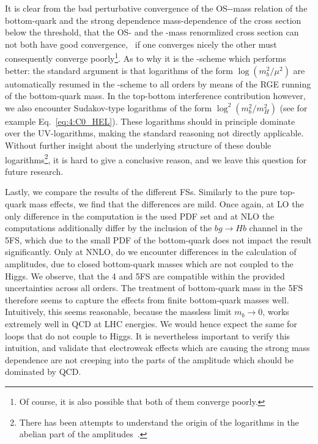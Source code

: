 It is clear from the bad perturbative convergence of the \acs{OS}-\MS-mass relation of the bottom-quark and the strong dependence mass-dependence of the cross section below the threshold, that the \acs{OS}- and the \MS-mass renormlized cross section can not both have good convergence, \ie\ if one converges nicely the other must consequently converge poorly\footnote{Of course, it is also possible that both of them converge poorly.}. As to why it is the \MS-scheme which performs better: the standard argument is that logarithms of the form $\log \left(m_b^2/\mu^2\right)$ are automatically resumed in the \MS-scheme to all orders by means of the \acs{RGE} running of the bottom-quark mass. In the top-bottom interference contribution however, we also encounter Sudakov-type logarithms of the form $\log^2 \left(m_b^2/m_H^2 \right)$ (see for example Eq.~\eqref{eq:4:C0_HEL}). These logarithms should in principle dominate over the \acs{UV}-logarithms, making the standard reasoning not directly applicable. Without further insight about the underlying structure of these double logarithms\footnote{There has been attempts to understand the origin of the logarithms in the abelian part of the amplitudes~\cite{Melnikov:2016emg}.}, it is hard to give a conclusive reason, and we leave this question for future research.

Lastly, we compare the results of the different \acs{FS}s. Similarly to the pure top-quark mass effects, we find that the differences are mild. Once again, at \acs{LO} the only difference in the computation is the used \acs{PDF} set and at \acs{NLO} the computations additionally differ by the inclusion of the $b g \longrightarrow Hb$ channel in the 5\acs{FS}, which due to the small \acs{PDF} of the bottom-quark does not impact the result significantly. Only at \acs{NNLO}, do we encounter differences in the calculation of amplitudes, due to closed bottom-quark masses which are not coupled to the Higgs. We observe, that the 4 and 5\acs{FS} are compatible within the provided uncertainties across all orders. The treatment of bottom-quark mass in the 5\acs{FS} therefore seems to capture the effects from finite bottom-quark masses well. Intuitively, this seems reasonable, because the massless limit $m_b \rightarrow 0$, works extremely well in \acs{QCD} at \acs{LHC} energies. We would hence expect the same for loops that do not couple to Higgs. It is nevertheless important to verify this intuition, and validate that electroweak effects which are causing the strong mass dependence are not creeping into the parts of the amplitude which should be dominated by \acs{QCD}.



